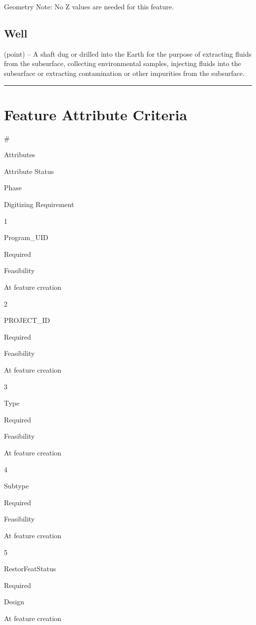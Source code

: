 \documentclass[
  letterpaper,
  DIV=11,
  numbers=noendperiod]{scrreprt}
\begin{document}
Geometry Note: No Z values are needed for this feature.

\subsection{Well}\label{well-1}

(point) -- A shaft dug or drilled into the Earth for the purpose of
extracting fluids from the subsurface, collecting environmental samples,
injecting fluids into the subsurface or extracting contamination or
other impurities from the subsurface.

\begin{center}\rule{0.5\linewidth}{0.5pt}\end{center}

\section{Feature Attribute
Criteria}\label{feature-attribute-criteria-15}

\#

Attributes

Attribute Status

Phase

Digitizing Requirement

1

Program\_UID

Required

Feasibility

At feature creation

2

PROJECT\_ID

Required

Feasibility

At feature creation

3

Type

Required

Feasibility

At feature creation

4

Subtype

Required

Feasibility

At feature creation

5

RestorFeatStatus

Required

Design

At feature creation
\end{document}
